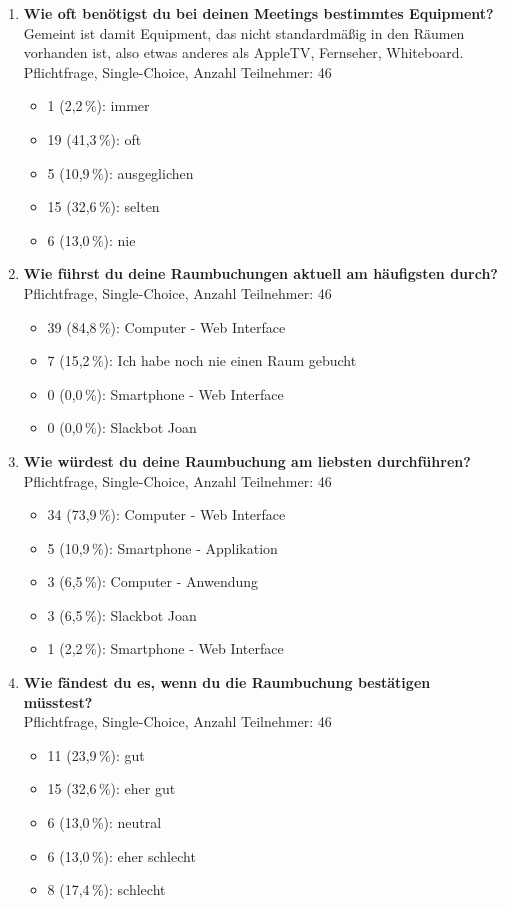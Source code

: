 \begin{enumerate}
    \item \textbf{Wie oft benötigst du bei deinen Meetings bestimmtes Equipment?} \\
    Gemeint ist damit Equipment, das nicht standardmäßig in den Räumen vorhanden ist, also etwas anderes als AppleTV, Fernseher, Whiteboard. \\ 
    Pflichtfrage, Single-Choice, Anzahl Teilnehmer: 46
    \begin{itemize}
        \item[] 1 (2,2\,\%): immer
        \item[] 19 (41,3\,\%): oft
        \item[] 5 (10,9\,\%): ausgeglichen
        \item[] 15 (32,6\,\%): selten
        \item[] 6 (13,0\,\%): nie
    \end{itemize}
    
     \item \textbf{Wie führst du deine Raumbuchungen aktuell am häufigsten durch?} \\ 
     Pflichtfrage, Single-Choice, Anzahl Teilnehmer: 46
    \begin{itemize}
        \item[] 39 (84,8\,\%): Computer - Web Interface
        \item[] 7 (15,2\,\%): Ich habe noch nie einen Raum gebucht
        \item[] 0 (0,0\,\%): Smartphone - Web Interface
        \item[] 0 (0,0\,\%): Slackbot Joan
    \end{itemize}
    
    \item \textbf{Wie würdest du deine Raumbuchung am liebsten durchführen?} \\ 
    Pflichtfrage, Single-Choice, Anzahl Teilnehmer: 46
    \begin{itemize}
        \item[] 34 (73,9\,\%): Computer - Web Interface
        \item[] 5 (10,9\,\%): Smartphone - Applikation
        \item[] 3 (6,5\,\%): Computer - Anwendung
        \item[] 3 (6,5\,\%): Slackbot Joan
        \item[] 1 (2,2\,\%): Smartphone - Web Interface
    \end{itemize}
    
    \item \textbf{Wie fändest du es, wenn du die Raumbuchung bestätigen müsstest?} \\ 
    Pflichtfrage, Single-Choice, Anzahl Teilnehmer: 46
    \begin{itemize}
        \item[] 11 (23,9\,\%): gut
        \item[] 15 (32,6\,\%): eher gut
        \item[] 6 (13,0\,\%): neutral
        \item[] 6 (13,0\,\%): eher schlecht
        \item[] 8 (17,4\,\%): schlecht
    \end{itemize}
    

\end{enumerate}
